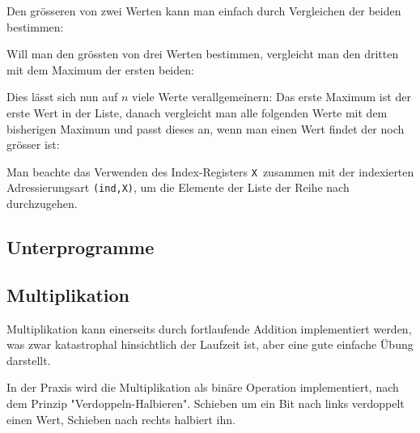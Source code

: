 \documentclass[11pt]{scrartcl}
\newcommand{\xreg}{\texttt{X}}
\newcommand{\indx}{\texttt{(ind,X)}}
\begin{document}
Den grösseren von zwei Werten kann man einfach durch Vergleichen der
beiden bestimmen:

 
Will man den grössten von drei Werten bestimmen, vergleicht man den
dritten mit dem Maximum der ersten beiden:


Dies lässt sich nun auf $n$ viele Werte verallgemeinern: Das erste
Maximum ist der erste Wert in der Liste, danach vergleicht man alle
folgenden Werte mit dem bisherigen Maximum und passt dieses an, wenn
man einen Wert findet der noch grösser ist:


Man beachte das Verwenden des Index-Registers \xreg\ zusammen mit der
indexierten Adressierungsart \indx, um die Elemente der Liste der
Reihe nach durchzugehen.

\subsection{Unterprogramme}
\label{sec:example_2byte_add_sub}






\subsection{Multiplikation}
\label{sec:example_mult}

Multiplikation kann einerseits durch fortlaufende Addition
implementiert werden, was zwar katastrophal hinsichtlich der Laufzeit
ist, aber eine gute einfache Übung darstellt.



In der Praxis wird die Multiplikation als binäre Operation
implementiert, nach dem Prinzip "Verdoppeln-Halbieren". Schieben um
ein Bit nach links verdoppelt einen Wert, Schieben nach rechts
halbiert ihn.
\end{document}

